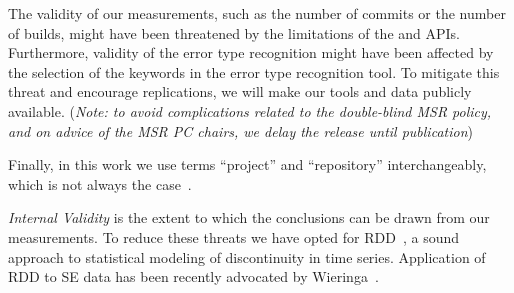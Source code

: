 The validity of our measurements, such as the number of commits or the 
number of builds, might have been threatened by the limitations of the \GH 
and \Tvis APIs.
Furthermore, validity of the error type recognition might have been affected 
by the selection of the keywords in the error type recognition tool. 
To mitigate this threat and encourage replications, we will make our tools 
and data publicly available. (\emph{Note: to avoid complications related to the double-blind MSR policy, and on advice of the MSR PC chairs, we delay the release until publication}) %

Finally, in this work we use terms ``project'' and ``repository'' interchangeably, which is not always the case~\cite{Kalliamvakou2014Promises}. 


\smallskip \emph{Internal Validity} is the extent to which the conclusions can 
be drawn from our measurements. 
To reduce these threats we have opted for RDD~\cite{imbens2008regression}, 
a sound approach to statistical modeling of discontinuity in time series. 
Application of RDD to SE data has been recently advocated 
by Wieringa~\cite{Wieringa}.
 
